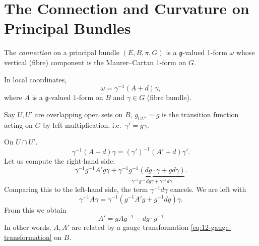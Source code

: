 
\section{The Connection and Curvature on Principal Bundles}%
\label{sec:the_connection_and_curvature_on_principal_bundles}

\begin{definition}[connection]
  The \emph{connection} on a principal bundle $(E, B, \pi, G)$ is a $\mathfrak{g}$-valued 1-form $\omega$ whose vertical (fibre) component is the Maurer--Cartan 1-form on $G$.
\end{definition}
In local coordinates,
\begin{equation}
  \omega = \gamma^{-1} (A + d) \gamma,
\end{equation}
where $A$ is a $\mathfrak{g}$-valued $1$-form on $B$ and $\gamma \in G$ (fibre bundle).

Say $U, U'$ are overlapping open sets on $B$, $g_{U U'} = g$ is the transition function acting on $G$ by left multiplication, i.e.~$\gamma' = g \gamma$.

On $U \cap U'$.
\begin{equation}
  \gamma^{-1} (A + d) \gamma = (\gamma')^{-1} (A' + d) \gamma'.
\end{equation}
Let us compute the right-hand side:
\begin{equation}
  \gamma^{-1} g^{-1} A' g \gamma + \underbrace{\gamma^{-1} g^{-1} (d g \cdot \gamma + g d \gamma)}_{\gamma^{-1} g^{-1} d g \gamma + \gamma^{-1} d \gamma}.
\end{equation}
Comparing this to the left-hand side, the term $\gamma^{-1} d \gamma$ cancels. We are left with
\begin{equation}
  \gamma^{-1} A \gamma = \gamma^{-1} (g^{-1} A' g + g^{-1} d g) \gamma.
\end{equation}
From this we obtain
\begin{equation}
  \boxed{A' = g A g^{-1} - dg \cdot g^{-1}}
\end{equation}
In other words, $A, A'$ are related by a gauge transformation \eqref{eq:12-gauge-transformation} on $B$.

